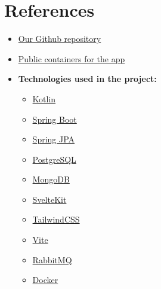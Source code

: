 \section{References}
\label{sec:references}

\begin{itemize}
    \item \href{https://github.com/Krissibro/DAT250-Sploinkyboink}{Our Github repository}
    \item \href{https://github.com/Krissibro?tab=packages&repo_name=DAT250-Sploinkyboink}{Public containers for the app}
    \item \textbf{Technologies used in the project:}
    \begin{itemize}
        \item \href{https://kotlinlang.org/}{Kotlin}
        \item \href{https://spring.io/projects/spring-boot}{Spring Boot}
        \item \href{https://spring.io/projects/spring-data-jpa}{Spring JPA}
        \item \href{https://www.postgresql.org/}{PostgreSQL}
        \item \href{https://www.mongodb.com/}{MongoDB}
        \item \href{https://svelte.dev/}{SvelteKit}
        \item \href{https://tailwindcss.com/}{TailwindCSS}
        \item \href{https://vite.dev/}{Vite}
        \item \href{https://www.rabbitmq.com/}{RabbitMQ}
        \item \href{https://www.docker.com/}{Docker}
    \end{itemize}
\end{itemize}
